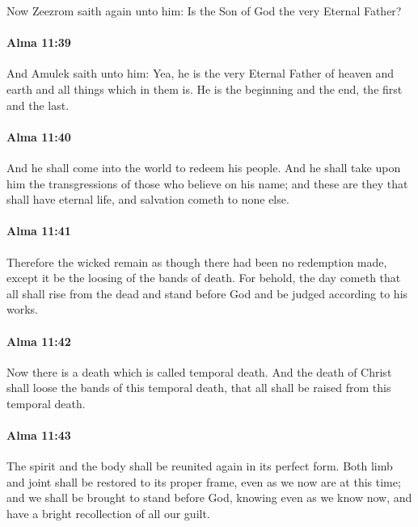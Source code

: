 			Now Zeezrom saith again unto him:
			Is the Son of God the very Eternal Father?

		\paragraph{Alma 11:39} %
			\label{ALMA-11-39}

			And Amulek saith unto him:
			Yea, he is the very Eternal Father of heaven and earth
			and all things which in them is.
			He is the beginning and the end,
			the first and the last.

		\paragraph{Alma 11:40} %
			\label{ALMA-11-40}

			And he shall come into the world to redeem his people.
			And he shall take upon him the transgressions of those who believe on his name;
			and these are they that shall have eternal life,
			and salvation cometh to none else.

		\paragraph{Alma 11:41} %
			\label{ALMA-11-41}

			Therefore the wicked remain as though there had been no redemption made,
			except it be the loosing of the bands of death.
			For behold, the day cometh that all shall rise from the dead
			and stand before God and be judged according to his works.

		\paragraph{Alma 11:42} %
			\label{ALMA-11-42}

			Now there is a death which is called temporal death.
			And the death of Christ shall loose the bands of this temporal death,
			that all shall be raised from this temporal death.

		\paragraph{Alma 11:43} %
			\label{ALMA-11-43}

			The spirit and the body shall be reunited again in its perfect form.
			Both limb and joint shall be restored to its proper frame,
			even as we now are at this time;
			and we shall be brought to stand before God,
			knowing even as we know now,
			and have a bright recollection of all our guilt.

